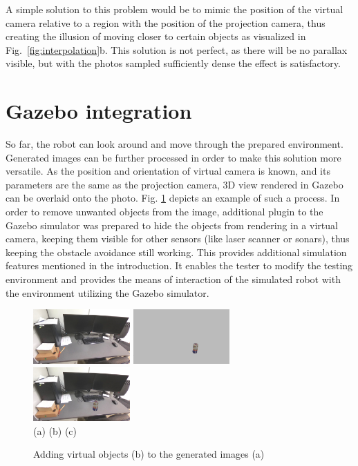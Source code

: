 \documentclass{svproc}
\begin{document}
A simple solution to this problem would be to mimic the position of the virtual camera relative 
to a region with the position of the projection camera, thus creating the illusion of moving closer 
to certain objects as visualized in Fig.~\ref{fig:interpolation}b. This solution is not perfect,
as there will be no parallax visible, but with the photos sampled sufficiently dense the effect is satisfactory.

\section{Gazebo integration}
\label{sec:gazebo}

So far, the robot can look around and move through the prepared environment. 
Generated images can be further processed in order to make this solution more versatile.
As the position and orientation of virtual camera is known, and its parameters are the same
as the projection camera, 3D view rendered in Gazebo can be overlaid onto the photo.
Fig. \ref{fig:join} depicts an example of such a process.
In order to remove unwanted objects from the image, additional plugin to the Gazebo simulator
was prepared to hide the objects from rendering in a virtual camera, keeping them 
visible for other sensors (like laser scanner or sonars), thus keeping the obstacle avoidance
still working. This provides additional simulation features mentioned in the introduction. 
It enables the tester to modify the testing environment and provides the means of interaction 
of the simulated robot with the environment utilizing the Gazebo simulator.

\begin{figure}[!ht]
    \centering
        \includegraphics[width=0.33\textwidth,trim=29cm 2cm 0 10cm,clip]{img/gazebo_integration/sim.jpg}\hfill%
        \includegraphics[width=0.33\textwidth,trim=29cm 2cm 0 10cm,clip]{img/gazebo_integration/gazebo.jpg}\hfill%
        \includegraphics[width=0.33\textwidth,trim=29cm 2cm 0 10cm,clip]{img/gazebo_integration/sum.jpg}\\
        \hfill (a) \hfill\hfill (b) \hfill\hfill (c) \hfill~
    \caption{Adding virtual objects (b) to the generated images (a)}
    \label{fig:join}
    \vspace{-5mm}
\end{figure}
\end{document}
